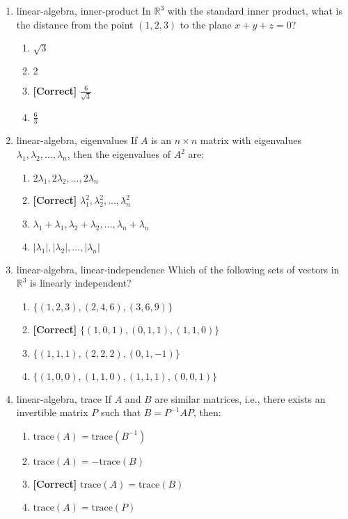 \documentclass{article}
\newenvironment{problem}{\item}{}
\newcommand{\choice}{\item}
\newcommand{\correctchoice}{\item \textbf{[Correct] }}
\newcommand{\tags}[1]{#1} %
\begin{document}
\begin{enumerate}
        \begin{problem}
            \tags{linear-algebra, inner-product}
            In $\mathbb{R}^3$ with the standard inner product, what is the distance from the point $(1,2,3)$ to the plane $x + y + z = 0$?
            \begin{enumerate}
                \choice $\sqrt{3}$
                \choice $2$
                \correctchoice $\frac{6}{\sqrt{3}}$
                \choice $\frac{6}{3}$
            \end{enumerate}
        \end{problem}
        
        \begin{problem}
            \tags{linear-algebra, eigenvalues}
            If $A$ is an $n \times n$ matrix with eigenvalues $\lambda_1, \lambda_2, \ldots, \lambda_n$, then the eigenvalues of $A^2$ are:
            \begin{enumerate}
                \choice $2\lambda_1, 2\lambda_2, \ldots, 2\lambda_n$
                \correctchoice $\lambda_1^2, \lambda_2^2, \ldots, \lambda_n^2$
                \choice $\lambda_1 + \lambda_1, \lambda_2 + \lambda_2, \ldots, \lambda_n + \lambda_n$
                \choice $|\lambda_1|, |\lambda_2|, \ldots, |\lambda_n|$
            \end{enumerate}
        \end{problem}
        
        \begin{problem}
            \tags{linear-algebra, linear-independence}
            Which of the following sets of vectors in $\mathbb{R}^3$ is linearly independent?
            \begin{enumerate}
                \choice $\{(1,2,3), (2,4,6), (3,6,9)\}$
                \correctchoice $\{(1,0,1), (0,1,1), (1,1,0)\}$
                \choice $\{(1,1,1), (2,2,2), (0,1,-1)\}$
                \choice $\{(1,0,0), (1,1,0), (1,1,1), (0,0,1)\}$
            \end{enumerate}
        \end{problem}
        
        \begin{problem}
            \tags{linear-algebra, trace}
            If $A$ and $B$ are similar matrices, i.e., there exists an invertible matrix $P$ such that $B = P^{-1}AP$, then:
            \begin{enumerate}
                \choice $\text{trace}(A) = \text{trace}(B^{-1})$
                \choice $\text{trace}(A) = -\text{trace}(B)$
                \correctchoice $\text{trace}(A) = \text{trace}(B)$
                \choice $\text{trace}(A) = \text{trace}(P)$
            \end{enumerate}
        \end{problem}
        

\end{enumerate}
\end{document}
